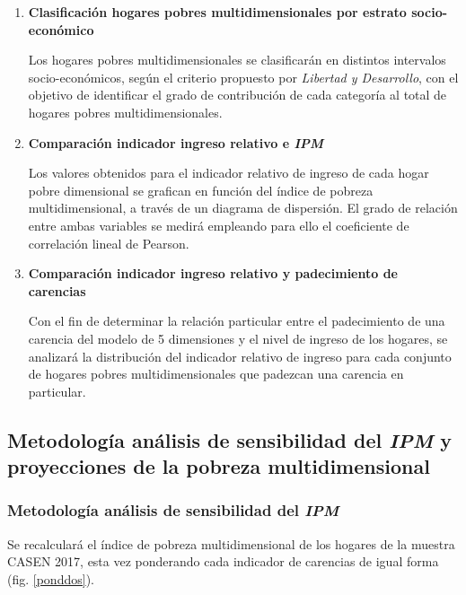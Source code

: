 \documentclass[12pt,letterpaper,spanish]{article}
\begin{document}
\begin{enumerate}
\vspace{2em}

\item \textbf{Clasificación hogares pobres multidimensionales por estrato socio-económico}

Los hogares pobres multidimensionales se clasificarán en distintos intervalos socio-económicos, según el criterio propuesto por \textit{Libertad y Desarrollo}, con el objetivo de identificar el grado de contribución de cada categoría al total de hogares pobres multidimensionales.

\vspace{2em}


\item \textbf{Comparación indicador ingreso relativo e \textit{IPM}}

Los valores obtenidos para el indicador relativo de ingreso de cada hogar pobre dimensional se grafican en función del índice de pobreza multidimensional, a través de un diagrama de dispersión. El grado de relación entre ambas variables se medirá empleando para ello el coeficiente de correlación lineal de Pearson. 

\vspace{2em}


\item \textbf{Comparación indicador ingreso relativo y padecimiento de carencias}

Con el fin de determinar la relación particular entre el padecimiento de una carencia del modelo de 5 dimensiones y el nivel de ingreso de los hogares, se analizará la distribución del indicador relativo de ingreso para cada conjunto de hogares pobres multidimensionales que padezcan una carencia en particular. 

\end{enumerate}




\newpage
\subsection{Metodología análisis de sensibilidad del \textit{IPM} y proyecciones de la pobreza multidimensional}


\subsubsection{Metodología análisis de sensibilidad del \textit{IPM}}


Se recalculará el índice de pobreza multidimensional de los hogares de la muestra CASEN 2017, esta vez ponderando cada indicador de carencias de igual forma (fig. \ref{ponddos}). 
\end{document}
